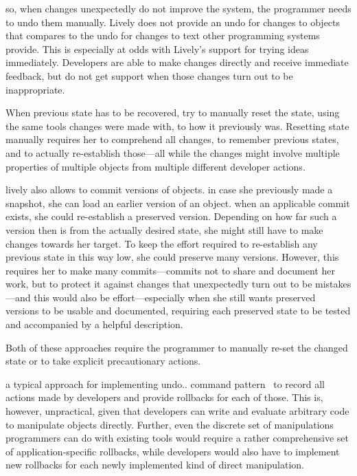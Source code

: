so, when changes unexpectedly do not improve the system, the programmer needs to undo them manually.
Lively does not provide an undo for changes to objects that compares to the undo for changes to text other programming systems provide.
This is especially at odds with Lively's support for trying ideas immediately.
Developers are able to make changes directly and receive immediate feedback, but do not get support when those changes turn out to be inappropriate.

When previous state has to be recovered, try to manually reset the state, using the same tools changes were made with, to how it previously was.
Resetting state manually requires her to comprehend all changes, to remember previous states, and to actually re-establish those---all while the changes might involve multiple properties of multiple objects from multiple different developer actions.

lively also allows to commit versions of objects.
in case she previously made a snapshot, she can load an earlier version of an object.
when an applicable commit exists, she could re-establish a preserved version.
Depending on how far such a version then is from the actually desired state, she might still have to make changes towards her target.
To keep the effort required to re-establish any previous state in this way low, she could preserve many versions.
However, this requires her to make many commits---commits not to share and document her work, but to protect it against changes that unexpectedly turn out to be mistakes---and this would also be effort---especially when she still wants preserved versions to be usable and documented, requiring each preserved state to be tested and accompanied by a helpful description.

Both of these approaches require the programmer to manually re-set the changed state or to take explicit precautionary actions.



a typical approach for implementing undo.. command pattern~\cite{GammaHelmJohnsonVlissides95} to record all actions made by developers and provide rollbacks for each of those. This is, however, unpractical, given that developers can write and evaluate arbitrary code to manipulate objects directly. Further, even the discrete set of manipulations programmers can do with existing tools would require a rather comprehensive set of application-specific rollbacks, while developers would also have to implement new rollbacks for each newly implemented kind of direct manipulation.

